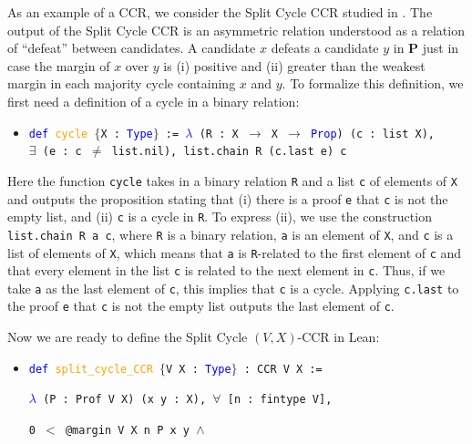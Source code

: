 \documentclass[runningheads]{llncs}
\begin{document}
\begin{example}\label{SplitCycleEx1} As an example of a CCR, we consider the Split Cycle CCR studied in \cite{HP2020}. The output of the Split Cycle CCR is an asymmetric relation understood as a relation of ``defeat'' between candidates. A candidate $x$ defeats a candidate $y$ in $\mathbf{P}$ just in case the margin of $x$ over $y$ is (i) positive and (ii) greater than the weakest margin in each majority cycle containing $x$ and $y$. To formalize this definition, we first need a definition of a cycle in a binary relation:
\begin{itemize}
\item[] \texttt{\textcolor{blue}{def} \textcolor{orange}{cycle} $\{$X : \textcolor{blue}{Type}$\}$ := \textcolor{blue}{$\lambda$} (R : X $\to$ X $\to$ \textcolor{blue}{Prop}) (c : list X), \\
$\exists$ (e : c $\neq$ list.nil), list.chain R (c.last e) c}
\end{itemize}
Here the function \texttt{cycle} takes in a binary relation \texttt{R} and a list \texttt{c} of elements of \texttt{X} and outputs the proposition stating that (i) there is a proof \texttt{e} that \texttt{c} is not the empty list, and (ii) \texttt{c} is a cycle in \texttt{R}. To express (ii), we use the construction \texttt{list.chain R a c}, where \texttt{R} is a binary relation, \texttt{a} is an element of \texttt{X}, and \texttt{c} is a list of elements of \texttt{X}, which means that \texttt{a} is \texttt{R}-related to the first element of \texttt{c} and that every element in the list \texttt{c} is related to the next element in \texttt{c}. Thus, if we take \texttt{a} as the last element of \texttt{c}, this implies that \texttt{c} is a cycle. Applying \texttt{c.last} to the proof \texttt{e} that \texttt{c} is not the empty list outputs the last element of \texttt{c}.

Now we are ready to define the Split Cycle $(V,X)$-CCR in Lean:
\begin{itemize}
\item[] \texttt{\textcolor{blue}{def} \textcolor{orange}{split\_cycle\_CCR} $\{$V X : \textcolor{blue}{Type}$\}$ : CCR V X :=} 

    \texttt{\textcolor{blue}{$\lambda$} (P : Prof V X) (x y : X), $\forall$ [n : fintype V],}
    
    \texttt{0 $<$ @margin V X n P x y $\wedge$}
    

\end{itemize}
\end{example}
\end{document}

